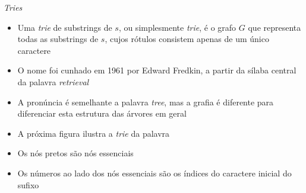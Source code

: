 \begin{frame}[fragile]{\it Tries}

    \begin{itemize}
        \item Uma {\it trie} de substrings de $s$, ou simplesmente {\it trie}, é o grafo $G$ que 
            representa todas as substrings de $s$, cujos rótulos consistem apenas de um único 
            caractere
        \pause

        \item O nome foi cunhado em 1961 por Edward Fredkin, a partir da sílaba central da palavra
            \textit{retrieval}
        \pause

        \item A pronúncia é semelhante a palavra \textit{tree}, mas a grafia é diferente para 
            diferenciar esta estrutura das árvores em geral
        \pause

        \item A próxima figura ilustra a \textit{trie} da palavra 
        \pause

        \item Os nós pretos são nós essenciais
        \pause

        \item Os números ao lado dos nós essenciais são os índices do caractere inicial do sufixo

    \end{itemize}

\end{frame}

